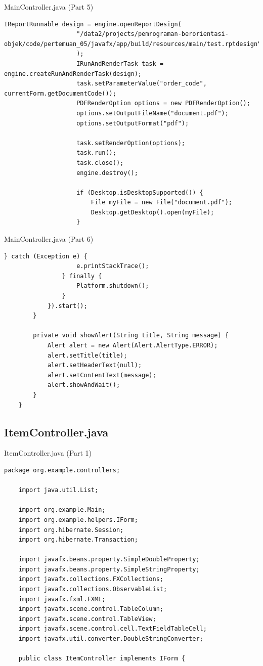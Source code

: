 \documentclass[aspectratio=169, table]{beamer}
\begin{document}
			\begin{frame}[fragile]{MainController.java (Part 5)}
				\vspace{20pt}
				\begin{lstlisting}[style=JavaStyle]
					IReportRunnable design = engine.openReportDesign(
					"/data2/projects/pemrograman-berorientasi-objek/code/pertemuan_05/javafx/app/build/resources/main/test.rptdesign"
					);
					IRunAndRenderTask task = engine.createRunAndRenderTask(design);
					task.setParameterValue("order_code", currentForm.getDocumentCode());
					PDFRenderOption options = new PDFRenderOption();
					options.setOutputFileName("document.pdf");
					options.setOutputFormat("pdf");
					
					task.setRenderOption(options);
					task.run();
					task.close();
					engine.destroy();
					
					if (Desktop.isDesktopSupported()) {
						File myFile = new File("document.pdf");
						Desktop.getDesktop().open(myFile);
					}
				\end{lstlisting}
			\end{frame}
			
			\begin{frame}[fragile]{MainController.java (Part 6)}
				\vspace{20pt}
				\begin{lstlisting}[style=JavaStyle]
				} catch (Exception e) {
					e.printStackTrace();
				} finally {
					Platform.shutdown();
				}
			}).start();
		}
		
		private void showAlert(String title, String message) {
			Alert alert = new Alert(Alert.AlertType.ERROR);
			alert.setTitle(title);
			alert.setHeaderText(null);
			alert.setContentText(message);
			alert.showAndWait();
		}
	}
\end{lstlisting}
\end{frame}

\subsection{ItemController.java}
\begin{frame}[fragile]{ItemController.java (Part 1)}
\vspace{20pt}
\begin{lstlisting}[style=JavaStyle]
	package org.example.controllers;
	
	import java.util.List;
	
	import org.example.Main;
	import org.example.helpers.IForm;
	import org.hibernate.Session;
	import org.hibernate.Transaction;
	
	import javafx.beans.property.SimpleDoubleProperty;
	import javafx.beans.property.SimpleStringProperty;
	import javafx.collections.FXCollections;
	import javafx.collections.ObservableList;
	import javafx.fxml.FXML;
	import javafx.scene.control.TableColumn;
	import javafx.scene.control.TableView;
	import javafx.scene.control.cell.TextFieldTableCell;
	import javafx.util.converter.DoubleStringConverter;
	
	public class ItemController implements IForm {
	\end{lstlisting}
\end{frame}
\end{document}
